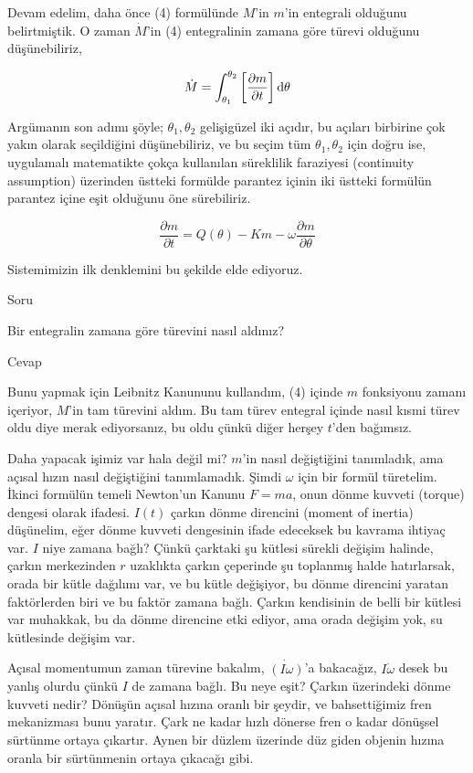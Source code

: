 \documentclass[12pt,fleqn]{article}\usepackage{../../common}
\begin{document}
Devam edelim, daha önce (4) formülünde $M$'in $m$'in entegrali olduğunu
belirtmiştik. O zaman $\dot{M}$'in (4) entegralinin zamana göre türevi
olduğunu düşünebiliriz,

$$ 
\dot{M} = \int_{\theta_1}^{\theta_2} \bigg[ \frac{\partial m}{\partial t} \bigg] \,\mathrm{d}\theta 
$$

Argümanın son adımı şöyle; $\theta_1,\theta_2$ gelişigüzel iki açıdır, bu
açıları birbirine çok yakın olarak seçildiğini düşünebiliriz, ve bu seçim
tüm $\theta_1,\theta_2$ için doğru ise, uygulamalı matematikte çokça
kullanılan süreklilik faraziyesi (continuity assumption) üzerinden üstteki
formülde parantez içinin iki üstteki formülün parantez içine eşit olduğunu
öne sürebiliriz.

$$ 
\frac{\partial m}{\partial t} = 
Q(\theta)  -  Km  - \omega \frac{\partial m}{\partial \theta}
$$

Sistemimizin ilk denklemini bu şekilde elde ediyoruz. 

Soru

Bir entegralin zamana göre türevini nasıl aldınız?

Cevap

Bunu yapmak için Leibnitz Kanununu kullandım, (4) içinde $m$ fonksiyonu
zamanı içeriyor, $M$'in tam türevini aldım. Bu tam türev entegral içinde
nasıl kısmi türev oldu diye merak ediyorsanız, bu oldu çünkü diğer herşey
$t$'den bağımsız. 

Daha yapacak işimiz var hala değil mi? $m$'in nasıl değiştiğini tanımladık,
ama açısal hızın nasıl değiştiğini tanımlamadık. Şimdi $\omega$ için bir
formül türetelim. İkinci formülün temeli Newton'un Kanunu $F = ma$, onun
dönme kuvveti (torque) dengesi olarak ifadesi. $I(t)$ çarkın dönme
direncini (moment of inertia) düşünelim, eğer dönme kuvveti dengesinin
ifade edeceksek bu kavrama ihtiyaç var. $I$ niye zamana bağlı? Çünkü
çarktaki şu kütlesi sürekli değişim halinde, çarkın merkezinden $r$
uzaklıkta çarkın çeperinde şu toplanmış halde hatırlarsak, orada bir kütle
dağılımı var, ve bu kütle değişiyor, bu dönme direncini yaratan
faktörlerden biri ve bu faktör zamana bağlı. Çarkın kendisinin de belli bir
kütlesi var muhakkak, bu da dönme direncine etki ediyor, ama orada değişim
yok, su kütlesinde değişim var.

Açısal momentumun zaman türevine bakalım, $\dot{(I \omega)}$'a bakacağız,
$I\dot{\omega}$ desek bu yanlış olurdu çünkü $I$ de zamana bağlı. Bu neye
eşit? Çarkın üzerindeki dönme kuvveti nedir? Dönüşün açısal hızına oranlı
bir şeydir, ve bahsettiğimiz fren mekanizması bunu yaratır. Çark ne kadar
hızlı dönerse fren o kadar dönüşsel sürtünme ortaya çıkartır. Aynen bir
düzlem üzerinde düz giden objenin hızına oranla bir sürtünmenin ortaya
çıkacağı gibi. 
\end{document}
